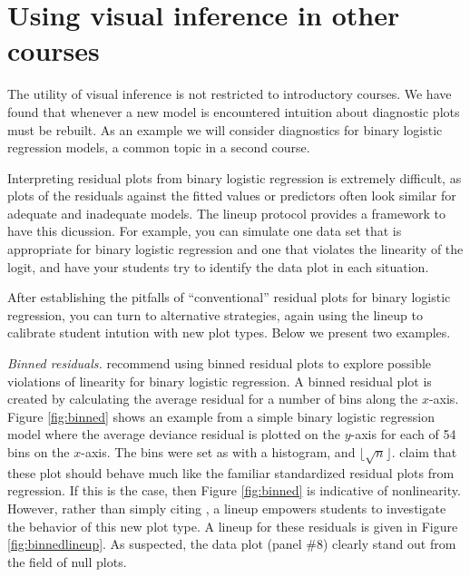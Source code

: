 \documentclass[12pt]{article}
\begin{document}
\section{Using visual inference in other courses}
\label{sec:othercourses}

The utility of visual inference is not restricted to introductory
courses. We have found that whenever a new model is encountered
intuition about diagnostic plots must be rebuilt. As an example we will
consider diagnostics for binary logistic regression models, a common
topic in a second course.

Interpreting residual plots from binary logistic regression is extremely
difficult, as plots of the residuals against the fitted values or
predictors often look similar for adequate and inadequate models. The
lineup protocol provides a framework to have this dicussion. For
example, you can simulate one data set that is appropriate for binary
logistic regression and one that violates the linearity of the logit,
and have your students try to identify the data plot in each situation.

After establishing the pitfalls of ``conventional'' residual plots for
binary logistic regression, you can turn to alternative strategies,
again using the lineup to calibrate student intution with new plot
types. Below we present two examples.

\emph{Binned residuals.} \citet{GelmanHill:2007} recommend using binned
residual plots to explore possible violations of linearity for binary
logistic regression. A binned residual plot is created by calculating
the average residual for a number of bins along the \(x\)-axis. Figure
\ref{fig:binned} shows an example from a simple binary logistic
regression model where the average deviance residual is plotted on the
\(y\)-axis for each of 54 bins on the \(x\)-axis. The bins were set as
with a histogram, and \(\lfloor \sqrt{n} \rfloor\).
\citet{GelmanHill:2007} claim that these plot should behave much like
the familiar standardized residual plots from regression. If this is the
case, then Figure \ref{fig:binned} is indicative of nonlinearity.
However, rather than simply citing \citet{GelmanHill:2007}, a lineup
empowers students to investigate the behavior of this new plot type. A
lineup for these residuals is given in Figure \ref{fig:binnedlineup}. As
suspected, the data plot (panel \#8) clearly stand out from the field of
null plots.
\end{document}
